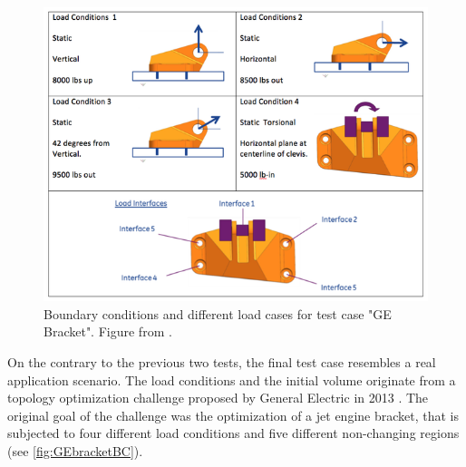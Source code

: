 \begin{figure}[H]
\begin{center}
\includegraphics[scale = 0.4]{Pictures/GEbracket.png}
\end{center}
\caption{Boundary conditions and different load cases for test case "GE Bracket". Figure from \cite{GEBracket}.}
\label{fig:GEbracketBC}
\end{figure}

On the contrary to the previous two tests, the final test case resembles a real application scenario. The load conditions and the initial volume originate from a topology optimization challenge proposed by General Electric in 2013 \cite{GEBracket}. The original goal of the challenge was the optimization of a jet engine bracket, that is subjected to four different load conditions and five different non-changing regions (see \autoref{fig:GEbracketBC}).

